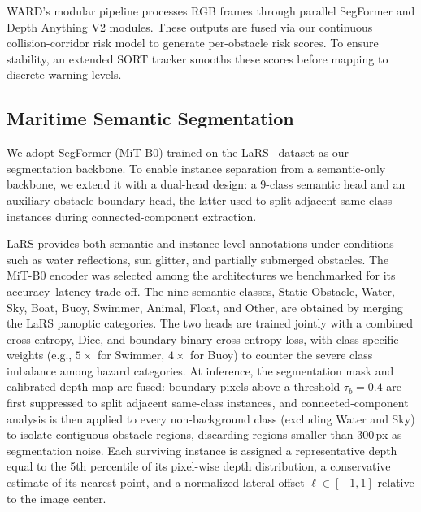 WARD's modular pipeline processes RGB frames through parallel SegFormer and Depth Anything V2 modules. These outputs are fused via our continuous collision-corridor risk model to generate per-obstacle risk scores. To ensure stability, an extended SORT tracker smooths these scores before mapping to discrete warning levels.

\subsection{Maritime Semantic Segmentation}
We adopt SegFormer (MiT-B0) trained on the LaRS~\cite{zust2023larsdiversepanopticmaritime} dataset as our segmentation backbone. To enable instance separation from a semantic-only backbone, we extend it with a dual-head design: a 9-class semantic head and an auxiliary obstacle-boundary head, the latter used to split adjacent same-class instances during connected-component extraction.

LaRS provides both semantic and instance-level annotations under conditions such as water reflections, sun glitter, and partially submerged obstacles. The MiT-B0 encoder was selected among the architectures we benchmarked for its accuracy--latency trade-off. The nine semantic classes, Static Obstacle, Water, Sky, Boat, Buoy, Swimmer, Animal, Float, and Other, are obtained by merging the LaRS panoptic categories. The two heads are trained jointly with a combined cross-entropy, Dice, and boundary binary cross-entropy loss, with class-specific weights (e.g., $5\times$ for Swimmer, $4\times$ for Buoy) to counter the severe class imbalance among hazard categories. At inference, the segmentation mask and calibrated depth map are fused: boundary pixels above a threshold $\tau_b=0.4$ are first suppressed to split adjacent same-class instances, and connected-component analysis is then applied to every non-background class (excluding Water and Sky) to isolate contiguous obstacle regions, discarding regions smaller than 300\,px as segmentation noise. Each surviving instance is assigned a representative depth equal to the 5th percentile of its pixel-wise depth distribution, a conservative estimate of its nearest point, and a normalized lateral offset $\ell \in [-1,1]$ relative to the image center.

